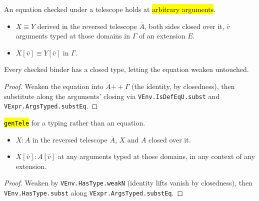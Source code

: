 \begin{lemma}
  \label{prim-cond:thm:reflection-gentele}
  \leanok

   An equation checked under a telescope holds at \hl{arbitrary arguments}.
  \begin{itemize}
  \item {} $X \equiv Y$ derived in the reversed telescope $\overline{A}$, both sides
    closed over it, $\bar v$ arguments typed at those domains in $\Gamma$ of an extension $E$.
  \item {} $X[\bar v] \equiv Y[\bar v]$ in $\Gamma$.
  \end{itemize}
  Every checked binder has a closed type, letting the equation weaken untouched.
\end{lemma}
\begin{proof}
  \leanok
   Weaken the equation into $\overline{A} \mathbin{+\!\!+} \Gamma$ (the identity, by
  closedness), then substitute along the arguments' closing via \texttt{VEnv.IsDefEqU.subst} and
  \texttt{VExpr.ArgsTyped.substEq}.
\end{proof}

\begin{lemma}
  \label{prim-cond:thm:reflection-gentelet}
  \leanok

   \hl{\texttt{genTele}} for a typing rather than an equation.
  \begin{itemize}
  \item {} $X : A$ in the reversed telescope $\overline{A}$, $X$ and $A$ closed over it.
  \item {} $X[\bar v] : A[\bar v]$ at any arguments typed at those domains, in any context
    of any extension.
  \end{itemize}
\end{lemma}
\begin{proof}
  \leanok
   Weaken by \texttt{VEnv.HasType.weakN} (identity lifts vanish by closedness), then
  \texttt{VEnv.HasType.subst} along \texttt{VExpr.ArgsTyped.substEq}.
\end{proof}

